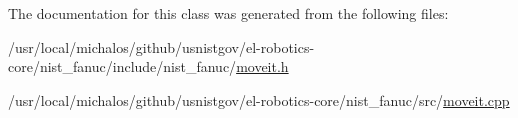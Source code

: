 The documentation for this class was generated from the following files\-:\begin{DoxyCompactItemize}
\item 
/usr/local/michalos/github/usnistgov/el-\/robotics-\/core/nist\-\_\-fanuc/include/nist\-\_\-fanuc/\hyperlink{moveit_8h}{moveit.\-h}\item 
/usr/local/michalos/github/usnistgov/el-\/robotics-\/core/nist\-\_\-fanuc/src/\hyperlink{moveit_8cpp}{moveit.\-cpp}\end{DoxyCompactItemize}
